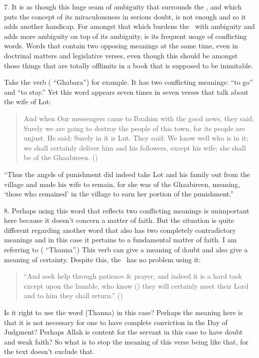 \documentclass[12pt]{memoir}
\begin{document}
7. It is as though this huge seam of ambiguity that surrounds the \Quran,
and which puts the concept of its miraculousness in serious doubt,
is not enough and so it adds another handicap.
For amongst that which burdens the \Quran\ with ambiguity
and adds more ambiguity on top of its ambiguity,
is its frequent usage of conflicting words.
Words that contain two opposing meanings at the same time,
even in doctrinal matters and legislative verses,
even though this should be amongst those things that are totally
off\–limits in a book that is supposed to be inimitable.

Take the verb ( “Ghabara”) for example.
It has two conflicting meanings: “to go” and “to stay.”
Yet this word appears seven times in seven verses
that talk about the wife of Lot:

\begin{quote}
And when Our messengers came to Ibrahim with the good news, they said:
Surely we are going to destroy the people of this town,
for its people are unjust.
He said: Surely in it is Lut.
They said: We know well who is in it; we shall certainly deliver him
and his followers, except his wife; she shall be of the Ghaabireen.
()
\end{quote}

“Thus the angels of punishment did indeed take Lot
and his family out from the village and made his wife to remain,
for she was of the Ghaabireen, meaning, ‘those who remained’
in the village to earn her portion of the punishment.”

8. Perhaps using this word that reflects two conflicting meanings
is unimportant here because it doesn’t concern a matter of faith.
But the situation is quite different regarding another word
that also has two completely contradictory meanings
and in this case it pertains to a fundamental matter of faith.
I am referring to ( “Thanna”.)
This verb can give a meaning of doubt
and also give a meaning of certainty.
Despite this, the \Quran\ has no problem using it:

\begin{quote}
“And seek help through patience \& prayer,
and indeed it is a hard task except upon the humble,
who know () they will certainly meet their Lord
and to him they shall return.” ()
\end{quote}

Is it right to use the word (Thanna) in this case?
Perhaps the meaning here is that it is not necessary
for one to have complete conviction in the Day of Judgment?
Perhaps Allah is content for the servant in this case
to have doubt and weak faith?
So what is to stop the meaning of this verse being like that,
for the text doesn’t exclude that.
\end{document}
